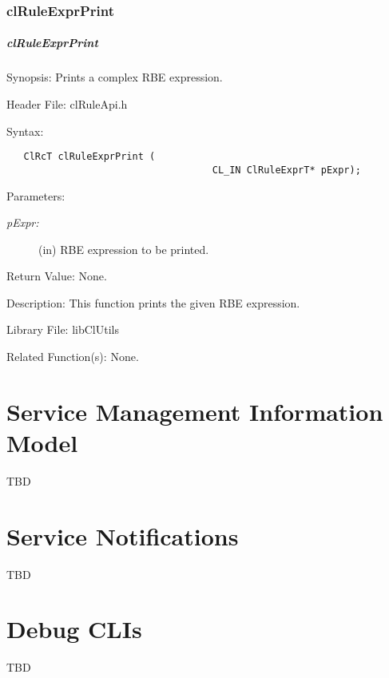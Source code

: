 \begin{flushleft}
\subsection{clRuleExprPrint}
\hypertarget{pagerule120}{}\paragraph{cl\-Rule\-Expr\-Print}\label{pagerule120}
\begin{Desc}
\item[Synopsis:]Prints a complex RBE expression.\end{Desc}
\begin{Desc}
\item[Header File:]clRuleApi.h\end{Desc}
\begin{Desc}
\item[Syntax:]

\footnotesize\begin{verbatim}   ClRcT clRuleExprPrint (
                              		CL_IN ClRuleExprT* pExpr);
\end{verbatim}
\normalsize
\end{Desc}
\begin{Desc}
\item[Parameters:]
\begin{description}
\item[{\em p\-Expr:}](in) RBE expression to be printed.\end{description}
\end{Desc}
\begin{Desc}
\item[Return Value:]None.\end{Desc}
\begin{Desc}
\item[Description:]This function prints the given RBE expression.\end{Desc}
\begin{Desc}
\item[Library File:]lib\-Cl\-Utils\end{Desc}
\begin{Desc}
\item[Related Function(s):]None. \end{Desc}

\chapter{Service Management Information Model}
TBD

\chapter{Service Notifications}
TBD

\chapter{Debug CLIs}
TBD


\end{flushleft}